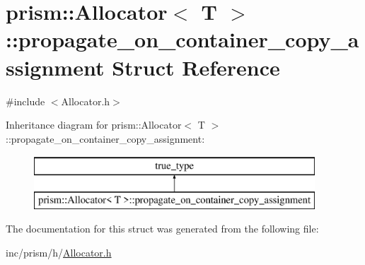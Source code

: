 \hypertarget{structprism_1_1_allocator_1_1propagate__on__container__copy__assignment}{}\section{prism\+:\+:Allocator$<$ T $>$\+:\+:propagate\+\_\+on\+\_\+container\+\_\+copy\+\_\+assignment Struct Reference}
\label{structprism_1_1_allocator_1_1propagate__on__container__copy__assignment}


{\ttfamily \#include $<$Allocator.\+h$>$}

Inheritance diagram for prism\+:\+:Allocator$<$ T $>$\+:\+:propagate\+\_\+on\+\_\+container\+\_\+copy\+\_\+assignment\+:\begin{figure}[H]
\begin{center}
\leavevmode
\includegraphics[height=2.000000cm]{structprism_1_1_allocator_1_1propagate__on__container__copy__assignment}
\end{center}
\end{figure}


The documentation for this struct was generated from the following file\+:\begin{DoxyCompactItemize}
\item 
inc/prism/h/\hyperlink{_allocator_8h}{Allocator.\+h}\end{DoxyCompactItemize}
